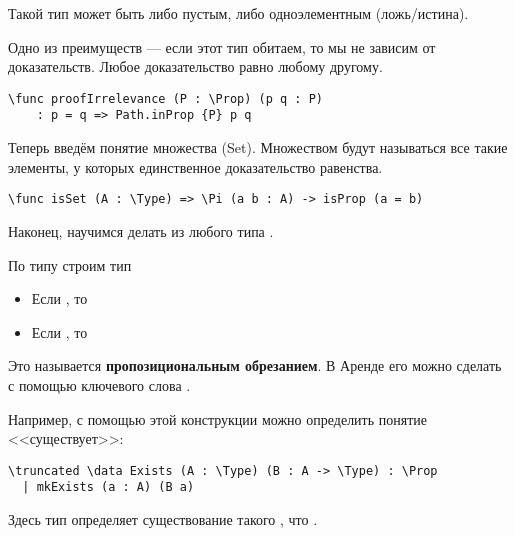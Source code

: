 Такой тип может быть либо пустым, либо одноэлементным (ложь/истина).

Одно из преимуществ  --- если этот тип обитаем, то мы не зависим от доказательств. Любое доказательство равно любому другому.
\begin{verbatim}
\func proofIrrelevance (P : \Prop) (p q : P)
    : p = q => Path.inProp {P} p q
\end{verbatim}

Теперь введём понятие множества (Set). Множеством будут называться все такие элементы, у которых единственное доказательство равенства.

\begin{verbatim}
\func isSet (A : \Type) => \Pi (a b : A) -> isProp (a = b)
\end{verbatim}

Наконец, научимся делать из любого типа .

По типу  строим тип 
\begin{itemize}
    \item Если , то 
    \item Если , то 
\end{itemize}
Это называется \textbf{пропозициональным обрезанием}. В Аренде его можно сделать с помощью ключевого слова \ard{\truncated}.

Например, с помощью этой конструкции можно определить понятие <<существует>>:
\begin{verbatim}
\truncated \data Exists (A : \Type) (B : A -> \Type) : \Prop
  | mkExists (a : A) (B a)
\end{verbatim}

Здесь тип  определяет существование такого , что .


